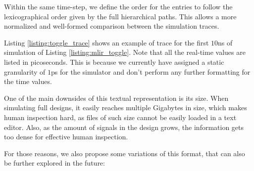 Within the same time-step, we define the order for the entries to follow the lexicographical order given by the full hierarchical paths. This allows a more normalized and well-formed comparison between the simulation traces.

Listing \ref{listing:toggle_trace} shows an example of trace for the first $10$ns of simulation of Listing \ref{listing:mlir_toggle}. Note that all the real-time values are listed in picoseconds. This is because we currently have assigned a static granularity of $1$ps for the simulator and don't perform any further formatting for the time values.


One of the main downsides of this textual representation is its size. When simulating full designs, it easily reaches multiple Gigabytes in size, which makes human inspection hard, as files of such size cannot be easily loaded in a text editor. Also, as the amount of signals in the design grows, the information gets too dense for effective human inspection.

For those reasons, we also propose some variations of this format, that can also be further explored in the future:

